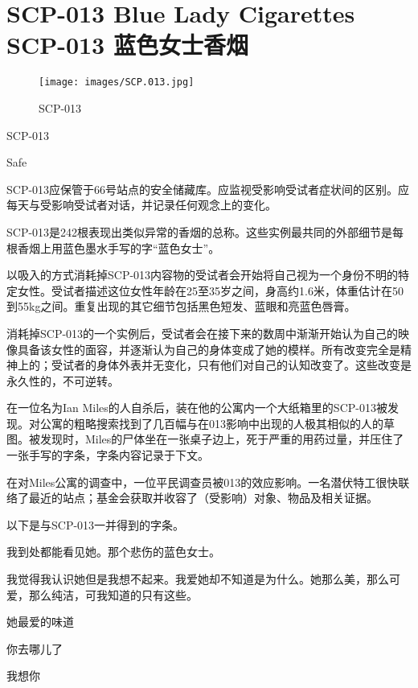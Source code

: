\chapter[SCP-013]{
    SCP-013 Blue Lady Cigarettes\\
    SCP-013 蓝色女士香烟
}

\label{chap:SCP-013}

\begin{figure}[H]
    \centering
    \texttt{[image: images/SCP.013.jpg]}
    \caption*{SCP-013}
\end{figure}

SCP-013

Safe

SCP-013应保管于66号站点的安全储藏库。应监视受影响受试者症状间的区别。应每天与受影响受试者对话，并记录任何观念上的变化。

SCP-013是242根表现出类似异常的香烟的总称。这些实例最共同的外部细节是每根香烟上用蓝色墨水手写的字“蓝色女士”。

以吸入的方式消耗掉SCP-013内容物的受试者会开始将自己视为一个身份不明的特定女性。受试者描述这位女性年龄在25至35岁之间，身高约1.6米，体重估计在50到55kg之间。重复出现的其它细节包括黑色短发、蓝眼和亮蓝色唇膏。

消耗掉SCP-013的一个实例后，受试者会在接下来的数周中渐渐开始认为自己的映像具备该女性的面容，并逐渐认为自己的身体变成了她的模样。所有改变完全是精神上的；受试者的身体外表并无变化，只有他们对自己的认知改变了。这些改变是永久性的，不可逆转。

在一位名为Ian Miles的人自杀后，装在他的公寓内一个大纸箱里的SCP-013被发现。对公寓的粗略搜索找到了几百幅与在013影响中出现的人极其相似的人的草图。被发现时，Miles的尸体坐在一张桌子边上，死于严重的用药过量，并压住了一张手写的字条，字条内容记录于下文。

在对Miles公寓的调查中，一位平民调查员被013的效应影响。一名潜伏特工很快联络了最近的站点；基金会获取并收容了（受影响）对象、物品及相关证据。

以下是与SCP-013一并得到的字条。

\begin{scpbox}

我到处都能看见她。那个悲伤的蓝色女士。

我觉得我认识她但是我想不起来。我爱她却不知道是为什么。她那么美，那么可爱，那么纯洁，可我知道的只有这些。

她最爱的味道

你去哪儿了

我想你

\end{scpbox}

